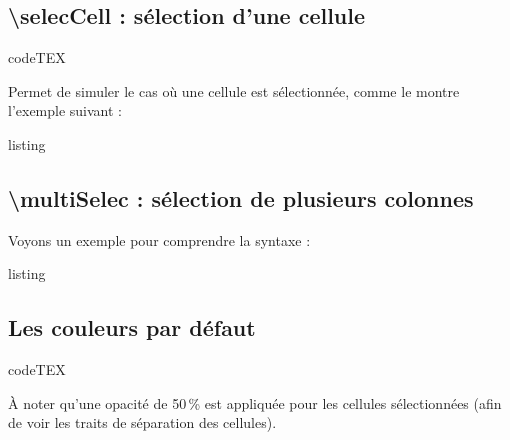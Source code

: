 \documentclass[a4paper,french]{article}
\begin{document}
\subsection{\textbackslash selecCell : s\'election d'une cellule}

\begin{tcblisting}{codeTEX}
\end{tcblisting}

\medskip

Permet de simuler le cas o\`u une cellule est s\'electionn\'ee, comme le montre l'exemple suivant :

\medskip

\begin{tcblisting}{listing}
\end{tcblisting}


\subsection{\textbackslash multiSelec : s\'election de plusieurs colonnes}

Voyons un exemple pour comprendre la syntaxe :

\medskip

\begin{tcblisting}{listing}
\end{tcblisting}

\newpage

\subsection{Les couleurs par d\'efaut}

\begin{tcblisting}{codeTEX}

\end{tcblisting}

\medskip

\`A noter qu'une opacit\'e de 50\,\% est appliqu\'ee pour les cellules s\'electionn\'ees (afin de voir les traits de s\'eparation des cellules).
\end{document}
